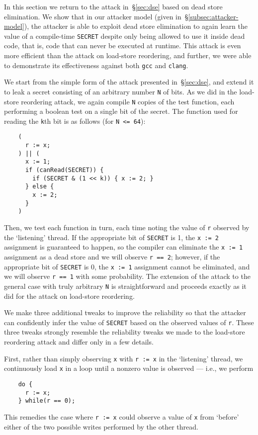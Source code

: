 In this section we return to the attack in~\S\ref{sec:dse} based on
dead store elimination.
We show that in our attacker model (given in~\S\ref{subsec:attacker-model}),
the attacker is able to exploit dead
store elimination to again learn the value of a compile-time \verb|SECRET|
despite only being allowed to use it inside dead code, that is, code that can
never be executed at runtime.
This attack is even more efficient than the attack on load-store reordering,
and further, we were able to demonstrate its effectiveness against both
\verb|gcc| and \verb|clang|.

We start from the simple form of the attack presented in~\S\ref{sec:dse},
and extend it to leak a secret consisting of an
arbitrary number \verb|N| of bits.
As we did in the load-store reordering attack, we again compile \verb|N| copies
of the test function, each performing a boolean test on a single bit of the
secret.
The function used for reading the \verb|k|th bit is as follows (for
\verb|N <= 64|):
\begin{verbatim}
    (
      r := x;
    ) || (
      x := 1;
      if (canRead(SECRET)) {
        if (SECRET & (1 << k)) { x := 2; }
      } else {
        x := 2;
      }
    )
\end{verbatim}
Then, we test each function in turn, each time noting the value of \verb|r|
observed by the `listening' thread.
If the appropriate bit of \verb|SECRET| is 1, the \verb|x := 2| assignment is
guaranteed to happen, so the compiler can eliminate the \verb|x := 1|
assignment as a dead store and we will observe \verb|r == 2|; however, if the
appropriate bit of \verb|SECRET| is 0, the \verb|x := 1| assignment cannot be
eliminated, and we will observe \verb|r == 1| with some probability.
The extension of the attack to the general case with truly arbitrary \verb|N|
is straightforward and proceeds exactly as it did for the attack on
load-store reordering.

We make three additional tweaks to improve the reliability so that the attacker
can confidently infer the value of \verb|SECRET| based on the observed values
of \verb|r|.
These three tweaks strongly resemble the reliability tweaks we made to the
load-store reordering attack and differ only in a few details.

First, rather than simply observing \verb|x| with \verb|r := x| in the
`listening' thread, we continuously load \verb|x| in a loop until a
nonzero value is observed --- i.e., we perform
\begin{verbatim}
    do {
      r := x;
    } while(r == 0);
\end{verbatim}
This remedies the case where \verb|r := x| could observe a value of \verb|x|
from `before' either of the two possible writes performed by the other thread.

